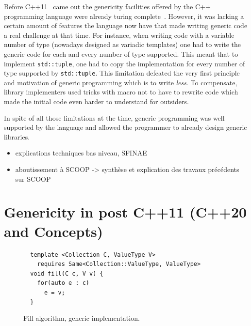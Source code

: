 Before C++11~\parencite{iso.2011.cpp} came out the genericity facilities offered by the C++ programming language were
already turing complete~\parencite{veldhuizen.2003.c++templates}. However, it was lacking a certain amount of features
the language now have that made writing generic code a real challenge at that time. For instance, when writing code
with a variable number of type (nowadays designed as variadic templates) one had to write the generic code for each and
every number of type supported. This meant that to implement \texttt{std::tuple}, one had to copy the implementation for
every number of type supported by \texttt{std::tuple}. This limitation defeated the very first principle and motivation
of generic programming which is to write \emph{less}. To compensate, library implementers used tricks with macro not to
have to rewrite code which made the initial code even harder to understand for outsiders.

In spite of all those limitations at the time, generic programming was well supported by the language and allowed the
programmer to already design generic libraries.




\begin{itemize}
  \item explications techniques bas niveau, SFINAE
  \item aboutissement à SCOOP -> synthèse et explication des travaux précédents sur SCOOP
\end{itemize}



\section{Genericity in post C++11 (C++20 and Concepts)}

\begin{figure}[tbh]
  \centering
  \begin{verbatim}
  template <Collection C, ValueType V>
    requires Same<Collection::ValueType, ValueType>
  void fill(C c, V v) {
    for(auto e : c)
      e = v;
  }
  \end{verbatim}

  \caption{Fill algorithm, generic implementation.}
  \label{fig.gen.fill}
\end{figure}


